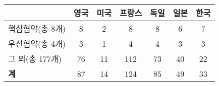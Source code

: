 \begin{tabular}{@{}lcccccc@{}}
\toprule
 & \textbf{영국} & \textbf{미국} & \textbf{프랑스} & \textbf{독일} & \textbf{일본} & \textbf{한국} \\ 
\midrule
핵심협약(총 8개) & 8 & 2 & 8 & 8 & 6 & 7 \\
우선협약(총 4개) & 3 & 1 & 4 & 4 & 3 & 3 \\
그 외(총 177개)  & 76 & 11 & 112 & 73 & 40 & 22 \\
\midrule
\textbf{계}       & 87 & 14 & 124 & 85 & 49 & 33 \\
\bottomrule
\end{tabular}
